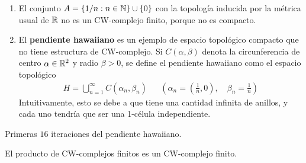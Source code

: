 \begin{example}
\begin{enumerate}
\item El conjunto $A=\{1/n: n \in \mathbb{N}\}\cup \{0\}$ con la topología
inducida por la métrica usual de $\mathbb{R}$ no es un CW-complejo finito, porque
no es compacto.

\item El \textbf{pendiente hawaiiano} es un ejemplo de espacio topológico
compacto que no tiene estructura de CW-complejo. Si $C(\alpha,\beta)$ denota
la circunferencia de centro $\alpha \in \mathbb{R}^2$ y radio $\beta > 0$, se
define el pendiente hawaiiano como el espacio topológico
\begin{align*}
H=\bigcup_{n=1}^\infty C(\alpha_n,\beta_n) &&
\left(\alpha_n=\left(\frac{1}{n},0\right), \quad 
\beta_n=\frac{1}{n}\right)
\end{align*}
Intuitivamente, esto se debe a que tiene una cantidad infinita de anillos, y
cada uno tendría que ser una 1-célula independiente.
\end{enumerate}
\end{example}

\begin{marginfigure}

\caption{Primeras $16$ iteraciones del pendiente hawaiiano.}
\end{marginfigure}

\begin{proposition}
El producto de CW-complejos finitos es un CW-complejo finito.
\end{proposition}

